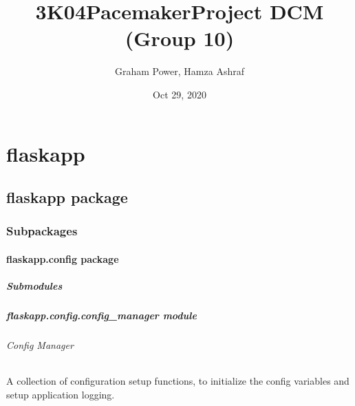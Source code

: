 \documentclass[letterpaper,10pt,english]{sphinxmanual}
\title{3K04\sphinxhyphen{}PacemakerProject DCM (Group 10)}
\date{Oct 29, 2020}
\author{Graham Power, Hamza Ashraf}
\begin{document}
\pagestyle{empty}
\sphinxmaketitle
\pagestyle{plain}
\sphinxtableofcontents
\pagestyle{normal}
\label{\detokenize{index::doc}}



\chapter{flaskapp}
\label{\detokenize{modules:flaskapp}}\label{\detokenize{modules::doc}}

\section{flaskapp package}
\label{\detokenize{flaskapp:flaskapp-package}}\label{\detokenize{flaskapp::doc}}

\subsection{Subpackages}
\label{\detokenize{flaskapp:subpackages}}

\subsubsection{flaskapp.config package}
\label{\detokenize{flaskapp.config:flaskapp-config-package}}\label{\detokenize{flaskapp.config::doc}}

\paragraph{Submodules}
\label{\detokenize{flaskapp.config:submodules}}

\paragraph{flaskapp.config.config\_manager module}
\label{\detokenize{flaskapp.config:module-flaskapp.config.config_manager}}\label{\detokenize{flaskapp.config:flaskapp-config-config-manager-module}}

\subparagraph{Config Manager}
\label{\detokenize{flaskapp.config:config-manager}}
A collection of configuration setup
functions, to initialize the config
variables and setup application
logging.
\end{document}
